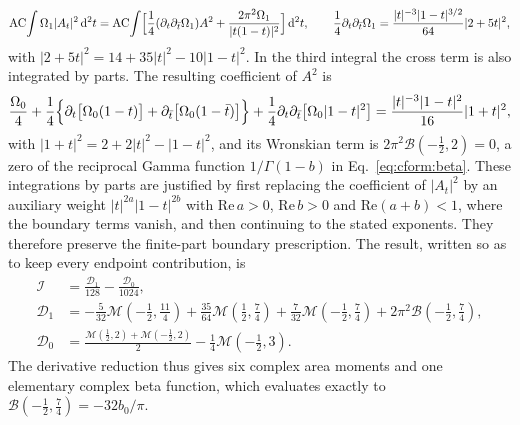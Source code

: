 \documentclass[11pt,a4paper]{article}
\numberwithin{equation}{section}
\newcommand{\dd}{\,\mathrm d}
\newcommand{\AC}{\operatorname{AC}}
\newcommand{\cI}{\mathcal I}
\begin{document}
\begin{equation}
 \AC\!\int\Omega_1|A_t|^2\dd^2t=\AC\!\int\Bigl[\frac14(\partial_t\partial_{\bar t}\Omega_1)A^2
 +\frac{2\pi^2\Omega_1}{|t(1-t)|^2}\Bigr]\dd^2t,\qquad
 \frac14\partial_t\partial_{\bar t}\Omega_1=\frac{|t|^{-3}|1-t|^{3/2}}{64}|2+5t|^2,
\end{equation}
with $|2+5t|^2=14+35|t|^2-10|1-t|^2$. In the third integral the cross term is also integrated by parts. The
resulting coefficient of $A^2$ is
\begin{equation}
 \frac{\Omega_0}4+\frac14\Bigl\{\partial_t\bigl[\Omega_0(1-t)\bigr]+\partial_{\bar t}\bigl[\Omega_0(1-\bar t)\bigr]\Bigr\}
 +\frac14\partial_t\partial_{\bar t}\bigl[\Omega_0|1-t|^2\bigr]
 =\frac{|t|^{-3}|1-t|^2}{16}|1+t|^2,
\end{equation}
with $|1+t|^2=2+2|t|^2-|1-t|^2$, and its Wronskian term is $2\pi^2\mathcal B(-\frac12,2)=0$, a zero of the reciprocal
Gamma function $1/\Gamma(1-b)$ in Eq.~\eqref{eq:cform:beta}. These integrations by parts are justified by first
replacing the coefficient of $|A_t|^2$ by an auxiliary weight $|t|^{2a}|1-t|^{2b}$ with $\mathrm{Re}\,a>0$,
$\mathrm{Re}\,b>0$ and $\mathrm{Re}(a+b)<1$, where the boundary terms vanish, and then continuing to the stated
exponents. They therefore preserve the finite-part boundary prescription. The result, written so as to keep every
endpoint contribution, is
\begin{equation}
\begin{aligned}
 \cI&=\frac{\mathcal D_1}{128}-\frac{\mathcal D_0}{1024},\\
 \mathcal D_1&=-\frac5{32}\mathcal M(-\tfrac12,\tfrac{11}4)+\frac{35}{64}\mathcal M(\tfrac12,\tfrac74)
 +\frac7{32}\mathcal M(-\tfrac12,\tfrac74)+2\pi^2\mathcal B(-\tfrac12,\tfrac74),\\
 \mathcal D_0&=\frac{\mathcal M(\frac12,2)+\mathcal M(-\frac12,2)}2-\frac14\mathcal M(-\tfrac12,3).
\end{aligned}
 \label{eq:cform:six}
\end{equation}
The derivative reduction thus gives six complex area moments and one elementary complex beta function, which
evaluates exactly to $\mathcal B(-\frac12,\frac74)=-32b_0/\pi$.
\end{document}
